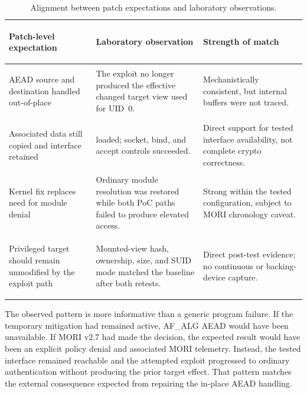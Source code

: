 \begin{table}[H]
    \centering
    \caption{Alignment between patch expectations and laboratory observations.}
    \label{tab:upstream-observation-alignment}
    \scriptsize
    \begin{tabularx}{\textwidth}{@{}>{\bfseries\raggedright\arraybackslash}p{}>{\raggedright\arraybackslash}p{}Y@{}}
        \toprule
        Patch-level expectation & Laboratory observation & Strength of match \\
        \midrule
        AEAD source and destination handled out-of-place &
        The exploit no longer produced the effective changed target view used
        for UID~0. &
        Mechanistically consistent, but internal buffers were not traced. \\

        Associated data still copied and interface retained &
         loaded; socket, bind, and accept controls succeeded. &
        Direct support for tested interface availability, not complete crypto
        correctness. \\

        Kernel fix replaces need for module denial &
        Ordinary module resolution was restored while both PoC paths failed to
        produce elevated access. &
        Strong within the tested configuration, subject to MORI chronology
        caveat. \\

        Privileged target should remain unmodified by the exploit path &
        Mounted-view hash, ownership, size, and SUID mode matched the baseline
        after both retests. &
        Direct post-test evidence; no continuous or backing-device capture. \\
        \bottomrule
    \end{tabularx}
\end{table}

The observed pattern is more informative than a generic program failure. If
the temporary mitigation had remained active, AF\_ALG AEAD would have been
unavailable. If MORI v2.7 had made the decision, the expected result would have
been an explicit policy denial and associated MORI telemetry. Instead, the
tested interface remained reachable and the attempted exploit progressed to
ordinary  authentication without producing the prior target effect.
That pattern matches the external consequence expected from repairing the
in-place AEAD handling.

